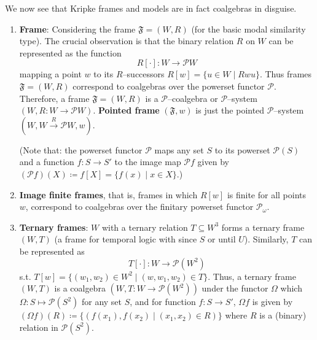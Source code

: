 \begin{example}
	We now see that Kripke frames and models are in fact coalgebras in disguise.	

	\begin{enumerate}[itemsep=5pt,parsep=5pt,leftmargin=3em,topsep=5pt,label=(\arabic*)]
	
	\item 
	\textbf{Frame}: 
	Considering the frame $\mathfrak{F} = (W,R)$ (for the basic modal similarity type).
	The crucial observation is that the binary relation $R$ on $W$ can be represented as the function 
	\[
		R[\cdot] \colon W \to \mathcal{P}W
	\]
	mapping a point $w$ to its $R$--successors $R[w] = \{u \in W \mid Rwu\}$. 
	Thus frames $\mathfrak{F} = (W,R)$ correspond to coalgebras over the {\color{purple} powerset functor $\mathcal{P}$}. 
	Therefore, 
	a frame $\mathfrak{F} = (W,R)$ is a {\color{purple} $\mathcal{P}$--coalgebra} or {\color{purple} $\mathcal{P}$--system} $(W, R \colon W \to \mathcal{P}W)$. 
	\textbf{Pointed frame} $(\mathfrak{F},w)$ is just the {\color{purple} pointed $\mathcal{P}$--system} $(W, W \xrightarrow{R} \mathcal{P}W, w)$.

	(Note that:
	the powerset functor $\mathcal{P}$ maps any set $S$ to its powerset $\mathcal{P}(S)$ and a function $f \colon S \to S'$ to the image map $\mathcal{P}f$ given by 
	$(\mathcal{P}f)(X) \coloneqq f[X] = \{f(x) \mid x \in X\}$.)

	

	\item 
	\textbf{Image finite frames},
	that is, frames in which $R[w]$ is finite for all points $w$, 
	correspond to coalgebras over the {\color{purple} finitary powerset functor $\mathcal{P}_\omega$}.

	
	\item  
	\textbf{Ternary frames}: 
	$W$ with a ternary relation $T \subseteq W^3$ forms a ternary frame $(W,T)$ (a frame for temporal logic with since $S$ or until $U$). 
	Similarly, $T$ can be represented as 
	\[
		T[\cdot] \colon W \to \mathcal{P}(W^2)
	\]
	s.t. $T[w] = \{(w_1,w_2) \in W^2 \mid (w,w_1,w_2) \in T\}$. 
	Thus, 
	a ternary frame $(W,T)$ is a coalgebra $(W, T \colon W \to \mathcal{P}(W^2))$  under the functor $\Omega$ which $\Omega \colon S \mapsto \mathcal{P}(S^2)$ for any set $S$, 
	and for function $f \colon S \to S'$,
	$\Omega f$  is given by 
	$(\Omega f)(R) \coloneqq \{(f(x_1),f(x_2) \mid (x_1,x_2) \in R)\}$ where $R$ is a (binary) relation in $\mathcal{P}(S^2)$.


\end{enumerate}
\end{example}
